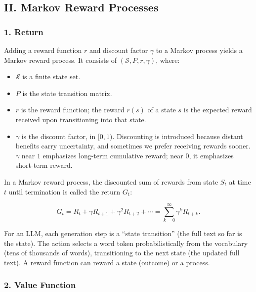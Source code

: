 \hypertarget{ii.-markov-reward-processes}{%
\subsection{II. Markov Reward Processes}\label{ii.-markov-reward-processes}}

\hypertarget{return}{%
\subsubsection{1. Return}\label{return}}

Adding a reward function \(r\) and discount factor \(\gamma\) to a Markov process yields a Markov reward process. It consists of \((\mathcal{S},P,r,\gamma)\), where:

\begin{itemize}
\tightlist
\item
  \(\mathcal{S}\) is a finite state set.
\item
  \(P\) is the state transition matrix.
\item
  \(r\) is the reward function; the reward \(r(s)\) of a state \(s\) is the expected reward received upon transitioning into that state.
\item
  \(\gamma\) is the discount factor, in \([0,1)\). Discounting is introduced because distant benefits carry uncertainty, and sometimes we prefer receiving rewards sooner. \(\gamma\) near \(1\) emphasizes long-term cumulative reward; near \(0\), it emphasizes short-term reward.
\end{itemize}

In a Markov reward process, the discounted sum of rewards from state \(S_t\) at time \(t\) until termination is called the return \(G_t\):

\[
G_t=R_t+\gamma R_{t+1}+\gamma^{2} R_{t+2}+\cdots
=\sum_{k=0}^{\infty}\gamma^{k} R_{t+k}.
\]

For an LLM, each generation step is a ``state transition'' (the full text so far is the state). The action selects a word token probabilistically from the vocabulary (tens of thousands of words), transitioning to the next state (the updated full text). A reward function can reward a state (outcome) or a process.

\hypertarget{value-function}{%
\subsubsection{2. Value Function}\label{value-function}}

